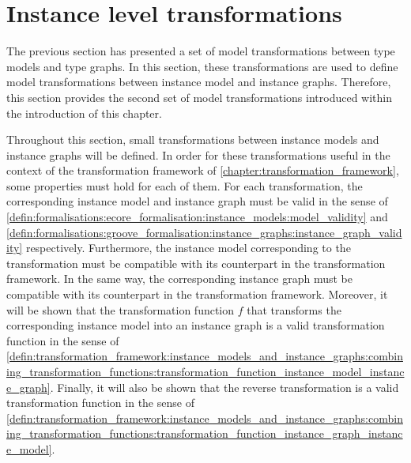 \section{Instance level transformations}
\label{sec:library_of_transformations:instance_level_transformations}

The previous section has presented a set of model transformations between type models and type graphs. In this section, these transformations are used to define model transformations between instance model and instance graphs. Therefore, this section provides the second set of model transformations introduced within the introduction of this chapter. 

Throughout this section, small transformations between instance models and instance graphs will be defined. In order for these transformations useful in the context of the transformation framework of \cref{chapter:transformation_framework}, some properties must hold for each of them. For each transformation, the corresponding instance model and instance graph must be valid in the sense of \cref{defin:formalisations:ecore_formalisation:instance_models:model_validity} and \cref{defin:formalisations:groove_formalisation:instance_graphs:instance_graph_validity} respectively. Furthermore, the instance model corresponding to the transformation must be compatible with its counterpart in the transformation framework. In the same way, the corresponding instance graph must be compatible with its counterpart in the transformation framework. Moreover, it will be shown that the transformation function $f$ that transforms the corresponding instance model into an instance graph is a valid transformation function in the sense of \cref{defin:transformation_framework:instance_models_and_instance_graphs:combining_transformation_functions:transformation_function_instance_model_instance_graph}. Finally, it will also be shown that the reverse transformation is a valid transformation function in the sense of \cref{defin:transformation_framework:instance_models_and_instance_graphs:combining_transformation_functions:transformation_function_instance_graph_instance_model}.










